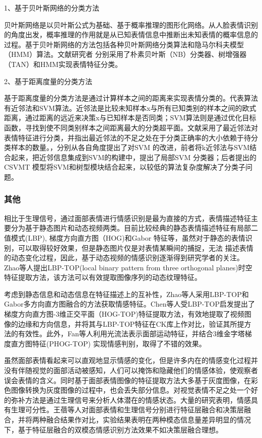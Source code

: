 1、基于贝叶斯网络的分类方法

贝叶斯网络是以贝叶斯公式为基础、基于概率推理的图形化网络。从人脸表情识别的角度出发，概率推理的作用就是从已知表情信息中推断出未知表情的概率信息的过程。基于贝叶斯网络的方法包括各种贝叶斯网络分类算法和隐马尔科夫模型（HMM）算法。文献\cite{cohen2003facial}研究者 分别采用了朴素贝叶斯（NB）分类器、树增强器（TAN）和HMM实现表情特征分类。

2、基于距离度量的分类方法

基于距离度量的分类方法是通过计算样本之间的距离来实现表情分类的。代表算法有近邻法和SVM算法。近邻法是比较未知样本x与所有已知类别的样本之间的欧式距离，通过距离的远近来决策x与已知样本是否同类；SVM算法则是通过优化目标函数，寻找到使不同类别样本之间距离最大的分类超平面。文献\cite{Fuxiaofen0}采用了最近邻法对表情特征进行分类，并指出最近邻法的不足之处在于分类正确率的大小依赖于待分类样本的数量。\cite{XuWenhui2009}，\cite{XuQinZhen2008}分别从各自角度提出了对SVM 的改进，前者将k近邻法与SVM结合起来，把近邻信息集成到SVM的构建中，提出了局部SVM 分类器；后者提出的CSVMT 模型将SVM和树型模块结合起来，以较低的算法复杂度解决了分类子问题。

\subsubsection{其他}

相比于生理信号，通过面部表情进行情感识别是最为直接的方式，表情描述特征主要分为基于静态图片和动态视频两类。目前比较经典的静态表情描述特征有局部二值模式(LBP), 梯度方向直方图（HOG)和Gabor 特征等，虽然对于静态的表情识别，可以取得较好效果，但是静态图片仅是对表情某瞬间的捕捉，无法
描述表情的动态变化过程，因此，基于动态视频的情感识别逐渐得到研究学者的关注。Zhao等人提出LBP-TOP(local binary pattern from three orthogonal
planes)时空特征提取方法，该方法可以有效提取图像序列的动态纹理特征。

考虑到静态信息和动态信息在特征描述上的互补性，Zhao等人采用LBP-TOP和Gabor多方向直方图融合的方法获取情感特征。Chen等人受LBP-TOP启发提出了梯度方向直方图-3维正交平面（HOG-TOP)特征提取方法，有效地提取了视频图像的边缘和方向信息，并将其与LBP-TOP特征在CK库上作对比，验证其所提方法的有效性。此外，Fan等人利用光流法表示面部运动特征，并结合3维金字塔梯度直方图特征(PHOG-TOP) 实现情感判别，取得了不错的效果。

虽然面部表情看起来可以直观地显示情感的变化，但是许多内在的情感变化过程并没有伴随视觉的面部活动被感知，人们可以掩饰和隐藏他们的情感体验，使观察者误会表情的含义。同时基于面部表情图像的特征提取方法大多基于灰度图像，在彩色图像转换为灰度图像的过程中，也会丢失部分信息。对视觉表情不足之处一个好的弥补方法是通过生理信号来分析人体潜在的情感状态。大量的研究表明，情感具有生理可分性。王蓓等人对面部表情和生理信号分别进行特征层融合和决策层融合，并将两种融合结果作对比，实验结果表明在两种模态信息量差异明显的情况下，基于特征层融合的双模态情感识别方法效果不如决策层融合理想。


